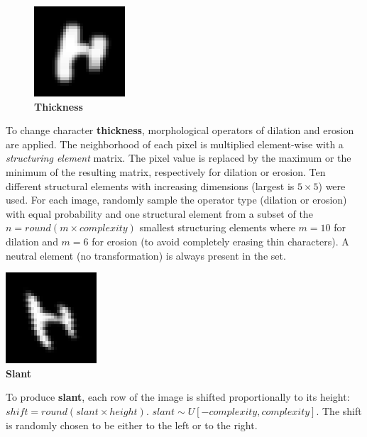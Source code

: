 \documentclass{article} %
\begin{document}
\begin{figure}
\begin{center}
\vspace*{-5mm}
\includegraphics[scale=.4]{images/Thick_only.png}\\
{\bf Thickness}
\end{center}
\end{figure}
To change character {\bf thickness}, morphological operators of dilation and erosion~\citep{Haralick87,Serra82}
are applied. The neighborhood of each pixel is multiplied
element-wise with a {\em structuring element} matrix.
The pixel value is replaced by the maximum or the minimum of the resulting
matrix, respectively for dilation or erosion. Ten different structural elements with 
increasing dimensions (largest is $5\times5$) were used.  For each image, 
randomly sample the operator type (dilation or erosion) with equal probability and one structural
element from a subset of the $n=round(m \times complexity)$ smallest structuring elements
where $m=10$ for dilation and $m=6$ for erosion (to avoid completely erasing thin characters).  
A neutral element (no transformation) 
is always present in the set.
\vspace*{3mm}

\begin{minipage}[b]{0.14\linewidth}
\centering
\includegraphics[scale=.4]{images/Slant_only.png}\\
{\bf Slant}
\end{minipage}%
\hspace{0.3cm}
\begin{minipage}[b]{0.83\linewidth}
To produce {\bf slant}, each row of the image is shifted
proportionally to its height: $shift = round(slant \times height)$.  
$slant \sim U[-complexity,complexity]$.
The shift is randomly chosen to be either to the left or to the right.
\vspace{8mm}
\end{minipage}
\vspace*{3mm}
\end{document}

